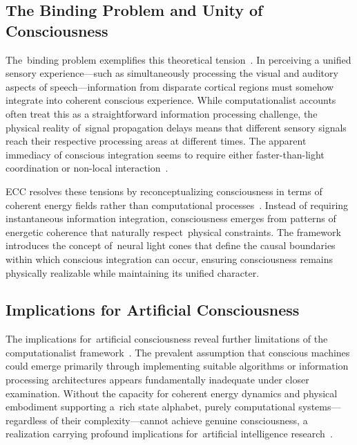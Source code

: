 \subsection*{The Binding Problem and Unity of Consciousness}

The~binding problem exemplifies this theoretical tension~\cite{varela1996neurophenomenology,gallagher2020phenomenological}. In perceiving a unified sensory experience—such as simultaneously processing the visual and auditory aspects of speech—information from disparate cortical regions must somehow integrate into coherent conscious experience. While computationalist accounts often treat this as a straightforward information processing challenge, the physical reality of~signal propagation delays means that different sensory signals reach their respective processing areas at different times. The apparent immediacy of conscious integration seems to require either faster-than-light coordination or non-local interaction~\cite{zheng2025unbearable,Beniaguev2021}.

ECC resolves these tensions by reconceptualizing consciousness in terms of coherent energy fields rather than computational processes~\cite{hunt2024electromagnetic,McFadden2020}. Instead of requiring instantaneous information integration, consciousness emerges from patterns of energetic coherence that naturally respect~physical constraints. The framework introduces the concept of~neural light cones that define the causal boundaries within which conscious integration can occur, ensuring consciousness remains physically realizable while maintaining its unified character.

\subsection*{Implications for Artificial Consciousness}

The implications for~artificial consciousness reveal further limitations of the computationalist framework~\cite{hunt2024electromagnetic,McFadden2020}. The prevalent assumption that conscious machines could emerge primarily through implementing suitable algorithms or information processing architectures appears fundamentally inadequate under closer examination. Without the capacity for coherent energy dynamics and physical embodiment supporting a~rich state alphabet, purely computational systems—regardless of their complexity—cannot achieve genuine consciousness, a realization carrying profound implications for~artificial intelligence research~\cite{seth2024conscious,da2024mathematical}.

